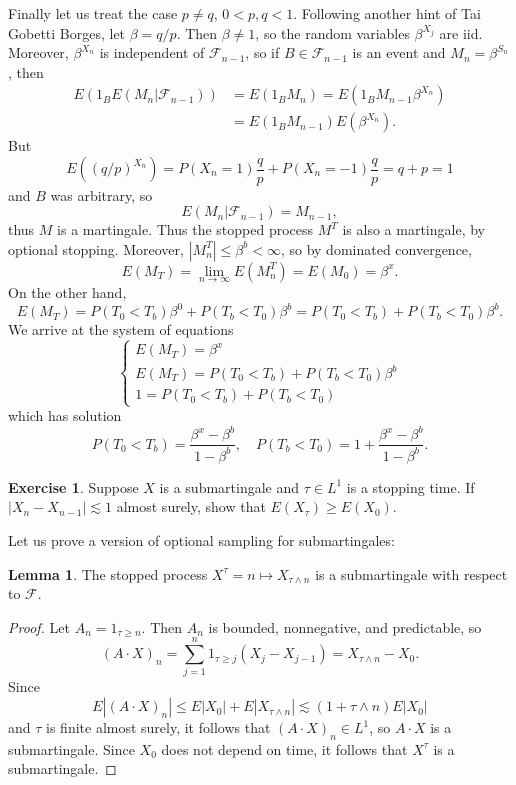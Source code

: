 \documentclass[10pt]{article}
\theoremstyle{definition}
\newtheorem{exer}{Exercise}
\newtheorem{lemma}{Lemma}[exer]
\begin{document}
Finally let us treat the case $p \neq q$, $0 < p, q < 1$.
Following another hint of Tai Gobetti Borges, let $\beta = q/p$. Then $\beta \neq 1$, so the random variables $\beta^{X_j}$ are iid.
Moreover, $\beta^{X_n}$ is independent of $\mathcal F_{n-1}$, so if $B \in \mathcal F_{n-1}$ is an event and $M_n = \beta^{S_n}$, then
\begin{align*}
E(1_B E(M_n|\mathcal F_{n-1})) &= E(1_B M_n) = E(1_B M_{n-1} \beta^{X_n})\\
&= E(1_B M_{n-1}) E(\beta^{X_n}).
\end{align*}
But
$$E((q/p)^{X_n}) = P(X_n = 1)\frac{q}{p} + P(X_n = -1)\frac{q}{p} = q + p = 1$$
and $B$ was arbitrary, so
$$E(M_n|\mathcal F_{n-1}) = M_{n-1},$$
thus $M$ is a martingale.
Thus the stopped process $M^T$ is also a martingale, by optional stopping.
Moreover, $|M^T_n| \leq \beta^b < \infty$, so by dominated convergence,
$$E(M_T) = \lim_{n \to \infty} E(M^T_n) = E(M_0) = \beta^x.$$
On the other hand,
$$E(M_T) = P(T_0 < T_b)\beta^0 + P(T_b < T_0)\beta^b = P(T_0 < T_b) + P(T_b < T_0)\beta^b.$$
We arrive at the system of equations
$$\begin{cases}
E(M_T) = \beta^x\\
E(M_T) = P(T_0 < T_b) + P(T_b < T_0)\beta^b\\
1 = P(T_0 < T_b) + P(T_b < T_0)
\end{cases}$$
which has solution
$$P(T_0 < T_b) = \frac{\beta^x - \beta^b}{1 - \beta^b},
\quad P(T_b < T_0) = 1 + \frac{\beta^x - \beta^b}{1 - \beta^b}.$$

\begin{exer}
Suppose $X$ is a submartingale and $\tau \in L^1$ is a stopping time. If $|X_n - X_{n-1}| \lesssim 1$ almost surely, show that $E(X_\tau) \geq E(X_0)$.
\end{exer}

Let us prove a version of optional sampling for submartingales:

\begin{lemma}
The stopped process $X^\tau = n \mapsto X_{\tau \wedge n}$ is a submartingale with respect to $\mathcal F$.
\end{lemma}
\begin{proof}
Let $A_n = 1_{\tau \geq n}$. Then $A_n$ is bounded, nonnegative, and predictable, so
$$(A \cdot X)_n = \sum_{j=1}^n 1_{\tau \geq j}(X_j - X_{j-1}) = X_{\tau \wedge n} - X_0.$$
Since
$$E|(A \cdot X)_n| \leq E|X_0| + E|X_{\tau \wedge n}| \lesssim (1 + \tau \wedge n) E|X_0|$$
and $\tau$ is finite almost surely, it follows that $(A \cdot X)_n \in L^1$, so $A \cdot X$ is a submartingale.
Since $X_0$ does not depend on time, it follows that $X^\tau$ is a submartingale.
\end{proof}
\end{document}
